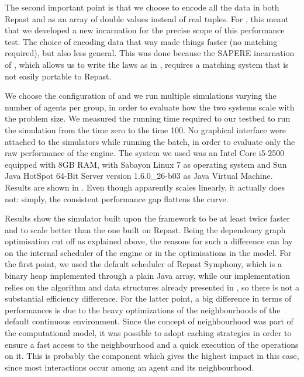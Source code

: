 \documentclass[12pt,a4paper,twoside,openright]{book}
\begin{document}
The second important point is that we choose to encode all the data in both Repast and \alchemist{} as an array of double values instead of real tuples.
%
For \alchemist{}, this meant that we developed a new incarnation for the precise scope of this performance test.
%
The choice of encoding data that way made things faster (no matching required), but also less general.
%
This was done because the SAPERE incarnation of \alchemist{}, which allows us to write the laws as in , requires a matching system that is not easily portable to Repast.

We choose the configuration of  and we run multiple simulations varying the number of agents per group, in order to evaluate how the two systems scale with the problem size.
%
We measured the running time required to our testbed to run the simulation from the time zero to the time 100.
%
No graphical interface were attached to the simulators while running the batch, in order to evaluate only the raw performance of the engine.
%
The system we used was an Intel Core i5-2500 equipped with 8GB RAM, with Sabayon Linux 7 as operating system and Sun Java HotSpot\texttrademark{} 64-Bit Server version 1.6.0\_26-b03 as Java Virtual Machine.
%
Results are shown in .
%
Even though \alchemist{} apparently scales linearly, it actually does not: simply, the consistent performance gap flattens the curve.

Results show the simulator built upon the \alchemist{} framework to be at least twice faster and to scale better than the one built on Repast.
%
Being the dependency graph optimisation cut off as explained above, the reasons for such a difference can lay on the internal scheduler of the engine or in the optimisations in the model.
%
For the first point, we used the default scheduler of Repast Symphony, which is a binary heap implemented through a plain Java array, while our implementation relies on the algorithm and data structures already presented in , so there is not a substantial efficiency difference.
%
For the latter point, a big difference in terms of performances is due to the heavy optimizations of the neighbourhoods of the default \alchemist{} continuous environment.
%
Since the concept of neighbourhood was part of the computational model, it was possible to adopt caching strategies in order to ensure a fast access to the neighbourhood and a quick execution of the operations on it.
%
This is probably the component which gives the highest impact in this case, since most interactions occur among an agent and its neighbourhood.
\end{document}
